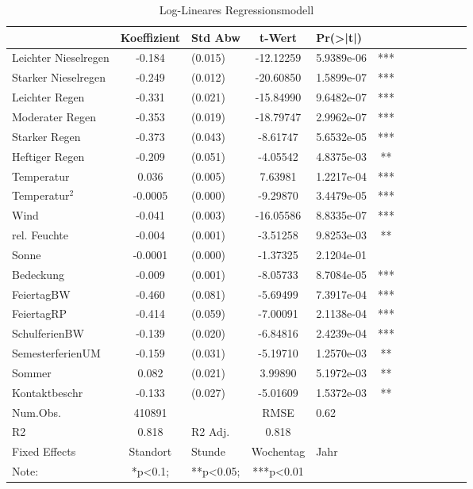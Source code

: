 \documentclass[a4paper,12pt]{thesis}
\begin{document}
\begin{table}[!ht]
	\centering
	\caption{Log-Lineares Regressionsmodell}
	\begin{tabular}[t]{lc lc lc lc lc lc}
		\toprule
		& Koeffizient & Std Abw & t-Wert & Pr(>|t|) & \\
		\midrule
		Leichter Nieselregen & -0.184 & (0.015) & -12.12259 & 5.9389e-06 & ***\\
		Starker Nieselregen & -0.249 & (0.012) & -20.60850 & 1.5899e-07 & ***\\
		Leichter Regen & -0.331 & (0.021) & -15.84990 & 9.6482e-07 & ***\\
		Moderater Regen & -0.353 & (0.019) & -18.79747 & 2.9962e-07 & ***\\
		Starker Regen & -0.373 & (0.043) & -8.61747 & 5.6532e-05 & ***\\
		Heftiger Regen & -0.209 & (0.051) & -4.05542 & 4.8375e-03 & **\\
		Temperatur & 0.036 & (0.005) & 7.63981 & 1.2217e-04 & ***\\
		Temperatur$^2$ & -0.0005 & (0.000) & -9.29870 & 3.4479e-05 & ***\\
		Wind & -0.041 & (0.003) & -16.05586 & 8.8335e-07 & ***\\
		rel. Feuchte & -0.004 & (0.001) & -3.51258 & 9.8253e-03 & **\\
		Sonne & -0.0001 & (0.000) & -1.37325 & 2.1204e-01 & \\
		Bedeckung & -0.009 & (0.001) & -8.05733 & 8.7084e-05 & ***\\
		FeiertagBW & -0.460 & (0.081) & -5.69499 & 7.3917e-04 & ***\\
		FeiertagRP & -0.414 & (0.059) & -7.00091 & 2.1138e-04 & ***\\
		SchulferienBW & -0.139 & (0.020) & -6.84816 & 2.4239e-04 & ***\\
		SemesterferienUM & -0.159 & (0.031) & -5.19710 & 1.2570e-03 & **\\
		Sommer & 0.082 & (0.021) & 3.99890 & 5.1972e-03 & **\\
		Kontaktbeschr & -0.133 & (0.027) & -5.01609 & 1.5372e-03 & **\\
		\midrule
		Num.Obs. & 410891& & RMSE & 0.62 & \\
		R2 & 0.818& R2 Adj. & 0.818 &  & \\
		\bottomrule
		Fixed Effects & Standort & Stunde & Wochentag & Jahr & \\
		Note: & *p<0.1; & **p<0.05; &***p<0.01 & &\\
	\end{tabular}
\label{reg1}
\end{table}
\end{document}
